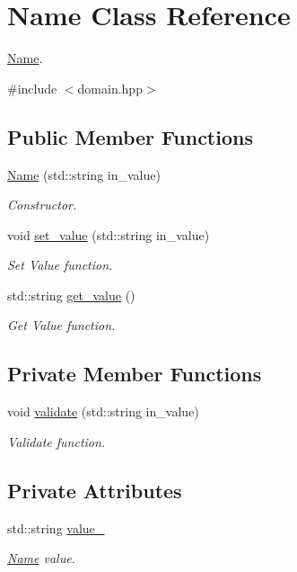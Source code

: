 \hypertarget{className}{}\section{Name Class Reference}
\label{className}


\hyperlink{className}{Name}.  




{\ttfamily \#include $<$domain.\+hpp$>$}

\subsection*{Public Member Functions}
\begin{DoxyCompactItemize}
\item 
\hyperlink{className_acc3c134ac7f5884a8b9d04ed0dd86a42}{Name} (std\+::string in\+\_\+value)
\begin{DoxyCompactList}\small\item\em Constructor. \end{DoxyCompactList}\item 
void \hyperlink{className_abcf51c2e29d4d3e14eb36a6622c500ab}{set\+\_\+value} (std\+::string in\+\_\+value)
\begin{DoxyCompactList}\small\item\em Set Value function. \end{DoxyCompactList}\item 
std\+::string \hyperlink{className_a102d9aa77579a889385b12d786eb8bd2}{get\+\_\+value} ()
\begin{DoxyCompactList}\small\item\em Get Value function. \end{DoxyCompactList}\end{DoxyCompactItemize}
\subsection*{Private Member Functions}
\begin{DoxyCompactItemize}
\item 
void \hyperlink{className_a8d3ae0c56b55941c684b3aaaa0311491}{validate} (std\+::string in\+\_\+value)
\begin{DoxyCompactList}\small\item\em Validate function. \end{DoxyCompactList}\end{DoxyCompactItemize}
\subsection*{Private Attributes}
\begin{DoxyCompactItemize}
\item 
std\+::string \hyperlink{className_a8860474fd3003c3187aa4f5ff3dc4b89}{value\+\_\+}
\begin{DoxyCompactList}\small\item\em \hyperlink{className}{Name} value. \end{DoxyCompactList}\end{DoxyCompactItemize}
